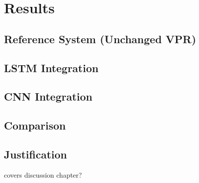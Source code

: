 \section{Results}

\subsection{Reference System (Unchanged \gls{VPR})}

\subsection{\gls{LSTM} Integration}

\subsection{\gls{CNN} Integration}

\subsection{Comparison}

\subsection{Justification}

covers discussion chapter?
